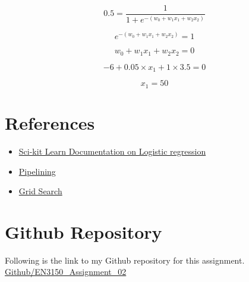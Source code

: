 \documentclass[11pt,a4paper]{article}
\begin{document}
\begin{equation}
    0.5 = \frac{1}{1 + e^{-(w_{0} + w_{1}x_{1} + w_{2}x_{2})}}
\end{equation}

\begin{equation}
    e^{-(w_{0} + w_{1}x_{1} + w_{2}x_{2})} = 1
\end{equation}

\begin{equation}
    w_{0} + w_{1}x_{1} + w_{2}x_{2} = 0
\end{equation}


\begin{equation}
    -6 + 0.05 \times x_{1} + 1 \times 3.5 = 0
\end{equation}


\begin{equation}
    x_{1} = 50
\end{equation}



\section{References}

\begin{itemize}
    \item \href{https://scikit-learn.org/stable/modules/generated/sklearn.linear_model.LinearRegression.html}{Sci-kit Learn Documentation on Logistic regression}
    \item \href{https://scikit-learn.org/stable/auto_examples/compose/plot_digits_pipe.html}{Pipelining}
    \item \href{https://scikit-learn.org/stable/modules/generated/sklearn.model_selection.GridSearchCV.html}{Grid Search}
   
\end{itemize}

\section{Github Repository}

Following is the link to my Github repository for this assignment.\\

\href{https://github.com/Vgr20/EN3150_Assignment_02.git}{Github/EN3150\_Assignment\_02}
\end{document}
